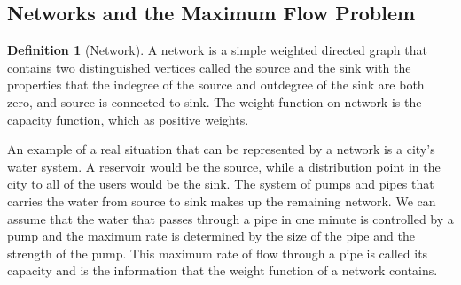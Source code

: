 \documentclass[10pt,]{book}
\theoremstyle{plain}
\theoremstyle{definition}
\newtheorem{definition}[theorem]{Definition}
\theoremstyle{definition}
\theoremstyle{definition}
\theoremstyle{definition}
\theoremstyle{definition}
\numberwithin{equation}{section}
\begin{document}
\subsection[Networks and the Maximum Flow Problem]{Networks and the Maximum Flow Problem}\label{ss-networks-and-flows}
\begin{definition}[Network]\label{def-network}
 A network is a simple weighted directed graph that contains two distinguished vertices called the  source and the  sink with the properties that the indegree of the source and outdegree of the sink are both zero, and source is connected to sink.  The weight function on network is the capacity function, which as positive weights. %
\end{definition}
An example of a real situation that can be represented by a network is a city's water system. A reservoir would be the source, while a distribution
point in the city to all of the users would be the sink. The system of pumps and pipes that carries the water from source to sink makes up the remaining
network. We can assume that the water that passes through a pipe in one minute is controlled by a pump and the maximum rate is determined by the
size of the pipe and the strength of the pump. This maximum rate of flow through a pipe is called its capacity and is the information that the weight
function of a network contains.%
\end{document}
